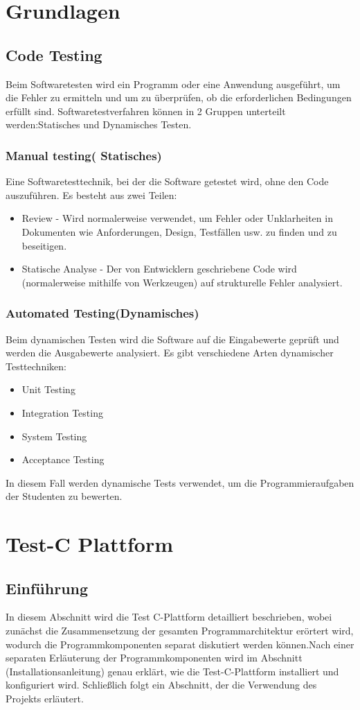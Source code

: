 \documentclass[a4paper,12pt,oneside]{book}
\begin{document}
\chapter{Grundlagen}
\section{Code Testing}
Beim Softwaretesten wird ein Programm oder eine Anwendung ausgeführt, um die Fehler zu ermitteln und um zu überprüfen, ob die erforderlichen Bedingungen erfüllt sind.
\newline
Softwaretestverfahren können in 2 Gruppen unterteilt werden:Statisches und Dynamisches Testen.
\subsection{Manual testing( Statisches)}
Eine Softwaretesttechnik, bei der die Software getestet wird, ohne den Code auszuführen. Es besteht aus zwei Teilen:
\begin{itemize}
	\item Review - Wird normalerweise verwendet, um Fehler oder Unklarheiten in Dokumenten wie Anforderungen, Design, Testfällen usw. zu finden und zu beseitigen.
	\item Statische Analyse - Der von Entwicklern geschriebene Code wird (normalerweise mithilfe von Werkzeugen) auf strukturelle Fehler analysiert. 
\end{itemize}
\subsection{Automated Testing(Dynamisches)}
Beim dynamischen Testen wird die Software auf die Eingabewerte geprüft und werden die Ausgabewerte analysiert. Es gibt verschiedene Arten dynamischer Testtechniken: 
\begin{itemize}
	\item Unit Testing
	\item Integration Testing
	\item System Testing
	\item Acceptance Testing
\end{itemize}
In diesem Fall werden dynamische Tests verwendet, um die Programmieraufgaben der Studenten zu bewerten.

\chapter{Test-C Plattform}
\section{Einführung}
In diesem Abschnitt wird die Test C-Plattform detailliert beschrieben, wobei zunächst die Zusammensetzung der gesamten Programmarchitektur erörtert wird, wodurch die Programmkomponenten separat diskutiert werden können.Nach einer separaten Erläuterung der Programmkomponenten wird im Abschnitt (Installationsanleitung) genau erklärt, wie die Test-C-Plattform installiert und konfiguriert wird. Schließlich folgt ein Abschnitt, der die Verwendung des Projekts erläutert.
\end{document}
